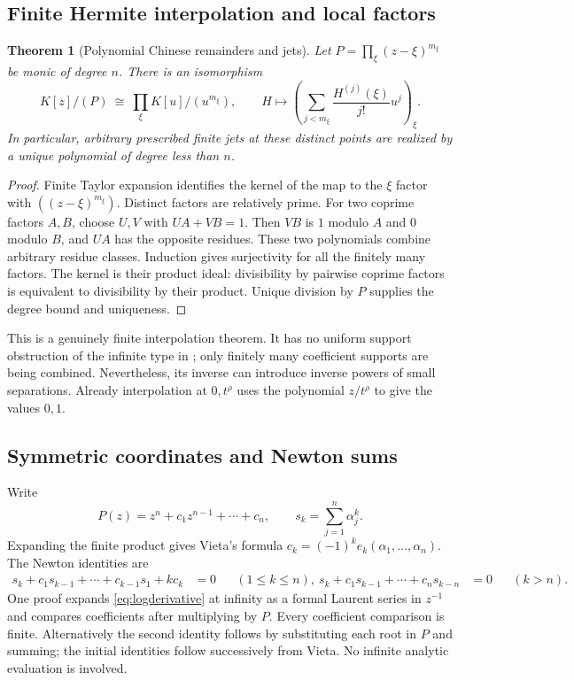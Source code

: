 \documentclass[11pt,letterpaper]{article}
\numberwithin{equation}{section}
\newtheorem{theorem}{Theorem}[section]
\theoremstyle{definition}
\theoremstyle{remark}\newtheorem{remark}[theorem]{Remark}
\begin{document}
\subsection{Finite Hermite interpolation and local factors}
\begin{theorem}[Polynomial Chinese remainders and jets]\label{thm:crt}
Let $P=\prod_\xi(z-\xi)^{m_\xi}$ be monic of degree $n$. There is an
isomorphism
\begin{equation}\label{eq:crt}
 K[z]/(P)\ \cong\ \prod_\xi K[u]/(u^{m_\xi}),\qquad
 H\longmapsto
 \left(\sum_{j<m_\xi}\frac{H^{(j)}(\xi)}{j!}u^j\right)_\xi.
\end{equation}
In particular, arbitrary prescribed finite jets at these distinct points
are realized by a unique polynomial of degree less than $n$.
\end{theorem}
\begin{proof}
Finite Taylor expansion identifies the kernel of the map to the $\xi$
factor with $((z-\xi)^{m_\xi})$. Distinct factors are relatively prime.
For two coprime factors $A,B$, choose $U,V$ with $UA+VB=1$.
Then $VB$ is $1$ modulo $A$ and $0$ modulo $B$, and $UA$ has the
opposite residues. These two polynomials combine arbitrary residue
classes. Induction gives surjectivity for all the finitely many factors.
The kernel is their product ideal: divisibility by pairwise coprime
factors is equivalent to divisibility by their product. Unique division
by $P$ supplies the degree bound and uniqueness.
\end{proof}
This is a genuinely finite interpolation theorem. It has no uniform
support obstruction of the infinite type in \cite{SourceGlobal}; only
finitely many coefficient supports are being combined. Nevertheless,
its inverse can introduce inverse powers of small separations. Already
interpolation at $0,t^\rho$ uses the polynomial $z/t^\rho$ to give the
values $0,1$.

\subsection{Symmetric coordinates and Newton sums}
Write
\[
 P(z)=z^n+c_1z^{n-1}+\cdots+c_n,\qquad
 s_k=\sum_{j=1}^n\alpha_j^k.
\]
Expanding the finite product gives Vieta's formula
$c_k=(-1)^ke_k(\alpha_1,\ldots,\alpha_n)$. The Newton identities are
\begin{align}
 s_k+c_1s_{k-1}+\cdots+c_{k-1}s_1+kc_k&=0 &&(1\le k\le n),\
 s_k+c_1s_{k-1}+\cdots+c_ns_{k-n}&=0 &&(k>n).
\end{align}
One proof expands \eqref{eq:logderivative} at infinity as a formal Laurent
series in $z^{-1}$ and compares coefficients after multiplying by $P$.
Every coefficient comparison is finite. Alternatively the second identity
follows by substituting each root in $P$ and summing; the initial identities
follow successively from Vieta. No infinite analytic evaluation is involved.
\end{document}
